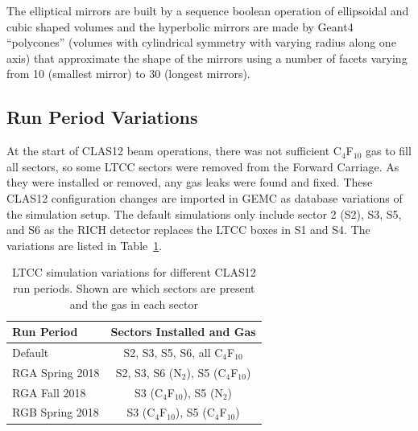 The elliptical mirrors are built by a sequence boolean operation of ellipsoidal
and cubic shaped volumes and the hyperbolic mirrors are made by Geant4 ``polycones'' (volumes with cylindrical symmetry
with varying radius along one axis) that approximate the shape of the mirrors using a number of facets
varying from 10 (smallest mirror) to 30 (longest mirrors). 


\subsection{Run Period Variations}

At the start of CLAS12 beam operations, there was not sufficient C$_4$F$_{10}$ gas to fill all sectors, so some
LTCC sectors were removed from the Forward Carriage. As they were installed or removed, any gas leaks were
found and fixed.
These CLAS12 configuration changes are imported in GEMC as database variations of the simulation setup.
The default simulations only include sector 2 (S2), S3, S5, and S6 as the RICH detector replaces the LTCC
boxes in S1 and S4. The variations are listed in Table~\ref{tab:simVariations}.

\begin{table}
	\begin{center}
		\begin{tabular}{| l | c |}
			\hline \hline
			Run Period       & Sectors Installed and Gas \\
			\hline
			Default          & S2, S3, S5, S6, all C$_4$F$_{10}$    \\
			RGA Spring 2018  & S2, S3, S6 (N$_2$), S5 (C$_4$F$_{10}$)  \\
			RGA Fall 2018    & S3 (C$_4$F$_{10}$), S5 (N$_2$)          \\
			RGB Spring 2018  & S3 (C$_4$F$_{10}$), S5 (C$_4$F$_{10}$) \\
			\hline \hline
		\end{tabular}
	\end{center}
	\caption{LTCC simulation variations for different CLAS12 run periods. Shown are which sectors are present
          and the gas in each sector}
	\label{tab:simVariations}
\end{table}
